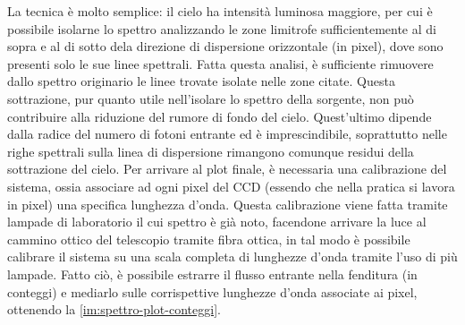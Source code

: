 La tecnica è molto semplice: il cielo ha intensità luminosa maggiore, per cui è possibile isolarne lo spettro analizzando le zone limitrofe sufficientemente al di sopra e al di sotto dela direzione di dispersione orizzontale (in pixel), dove sono presenti solo le sue linee spettrali. Fatta questa analisi, è sufficiente rimuovere dallo spettro originario le linee trovate isolate nelle zone citate. Questa sottrazione, pur quanto utile nell'isolare lo spettro della sorgente, non può contribuire alla riduzione del rumore di fondo del cielo. Quest'ultimo dipende dalla radice del numero di fotoni entrante ed è imprescindibile, soprattutto nelle righe spettrali sulla linea di dispersione rimangono comunque residui della sottrazione del cielo. Per arrivare al plot finale, è necessaria una calibrazione del sistema, ossia associare ad ogni pixel del CCD (essendo che nella pratica si lavora in pixel) una specifica lunghezza d'onda. Questa calibrazione viene fatta tramite lampade di laboratorio il cui spettro è già noto, facendone arrivare la luce al cammino ottico del telescopio tramite fibra ottica, in tal modo è possibile calibrare il sistema su una scala completa di lunghezze d'onda tramite l'uso di più lampade. Fatto ciò, è possibile estrarre il flusso entrante nella fenditura (in conteggi) e mediarlo sulle corrispettive lunghezze d'onda associate ai pixel, ottenendo la \ref{im:spettro-plot-conteggi}.


